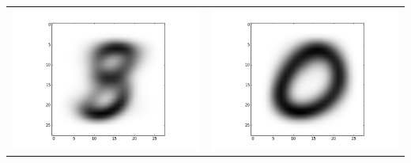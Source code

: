 \documentclass[11pt]{article}
\begin{document}
\begin{tabular}{cc}
\includegraphics[scale=0.4]{images/10-images/0} & \includegraphics[scale=0.4]{images/10-images/1} \\

\end{tabular}
\end{document}
